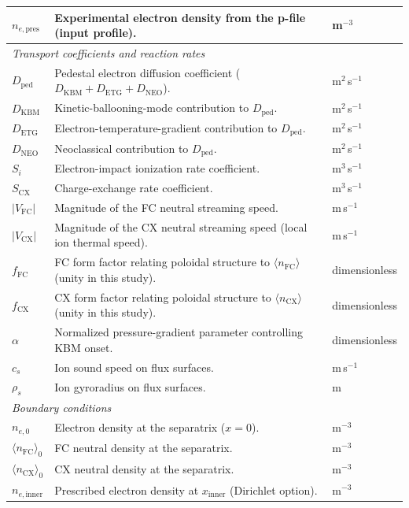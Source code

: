 \documentclass[twocolumn,secnumarabic,amssymb, nobibnotes, aps, prd]{revtex4-2}
\begin{document}
\begin{table}[t]
\begin{ruledtabular}
\begin{tabular}{lll}
$n_{e,\mathrm{pres}}$ & Experimental electron density from the p-file (input profile). & m$^{-3}$ \\
\hline
\multicolumn{3}{l}{\textit{Transport coefficients and reaction rates}} \\
$D_{\mathrm{ped}}$ & Pedestal electron diffusion coefficient ($D_{\mathrm{KBM}}+D_{\mathrm{ETG}}+D_{\mathrm{NEO}}$). & m$^2$\,s$^{-1}$ \\
$D_{\mathrm{KBM}}$ & Kinetic-ballooning-mode contribution to $D_{\mathrm{ped}}$. & m$^2$\,s$^{-1}$ \\
$D_{\mathrm{ETG}}$ & Electron-temperature-gradient contribution to $D_{\mathrm{ped}}$. & m$^2$\,s$^{-1}$ \\
$D_{\mathrm{NEO}}$ & Neoclassical contribution to $D_{\mathrm{ped}}$. & m$^2$\,s$^{-1}$ \\
$S_i$ & Electron-impact ionization rate coefficient. & m$^3$\,s$^{-1}$ \\
$S_{\mathrm{CX}}$ & Charge-exchange rate coefficient. & m$^3$\,s$^{-1}$ \\
$|V_{\mathrm{FC}}|$ & Magnitude of the FC neutral streaming speed. & m\,s$^{-1}$ \\
$|V_{\mathrm{CX}}|$ & Magnitude of the CX neutral streaming speed (local ion thermal speed). & m\,s$^{-1}$ \\
$f_{\mathrm{FC}}$ & FC form factor relating poloidal structure to $\langle n_{\mathrm{FC}}\rangle$ (unity in this study). & dimensionless \\
$f_{\mathrm{CX}}$ & CX form factor relating poloidal structure to $\langle n_{\mathrm{CX}}\rangle$ (unity in this study). & dimensionless \\
$\alpha$ & Normalized pressure-gradient parameter controlling KBM onset. & dimensionless \\
$c_s$ & Ion sound speed on flux surfaces. & m\,s$^{-1}$ \\
$\rho_s$ & Ion gyroradius on flux surfaces. & m \\
\hline
\multicolumn{3}{l}{\textit{Boundary conditions}} \\
$n_{e,0}$ & Electron density at the separatrix ($x=0$). & m$^{-3}$ \\
$\langle n_{\mathrm{FC}}\rangle_0$ & FC neutral density at the separatrix. & m$^{-3}$ \\
$\langle n_{\mathrm{CX}}\rangle_0$ & CX neutral density at the separatrix. & m$^{-3}$ \\
$n_{e,\mathrm{inner}}$ & Prescribed electron density at $x_{\mathrm{inner}}$ (Dirichlet option). & m$^{-3}$ \\

\end{tabular}
\end{ruledtabular}
\end{table}
\end{document}
